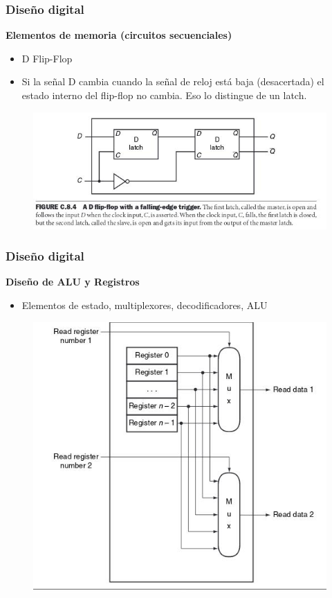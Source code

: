 \documentclass[aspectratio=169,compress]{beamer}
\begin{document}
\begin{footnotesize}
\begin{frame}[fragile]
\frametitle{Diseño digital}
\begin{center}\textbf{Elementos de memoria (circuitos secuenciales)}\end{center}
\begin{itemize}
\item D Flip-Flop
\item Si la señal D cambia cuando la señal de reloj está baja (desacertada)
el estado interno del flip-flop no cambia. Eso lo distingue de un latch.
\end{itemize}
\begin{figure}
\includegraphics[scale=0.4]{images/flip-flop-d.jpg} 
\end{figure}
\end{frame}

\begin{frame}[fragile]
\frametitle{Diseño digital}
\begin{center}\textbf{Diseño de ALU y Registros}\end{center}
\begin{itemize}
\item Elementos de estado, multiplexores, decodificadores, ALU
\end{itemize}
\begin{figure}
\includegraphics[scale=0.4]{images/leer-registro.jpg} 
\end{figure}
\end{frame}


\end{footnotesize}
\end{document}
